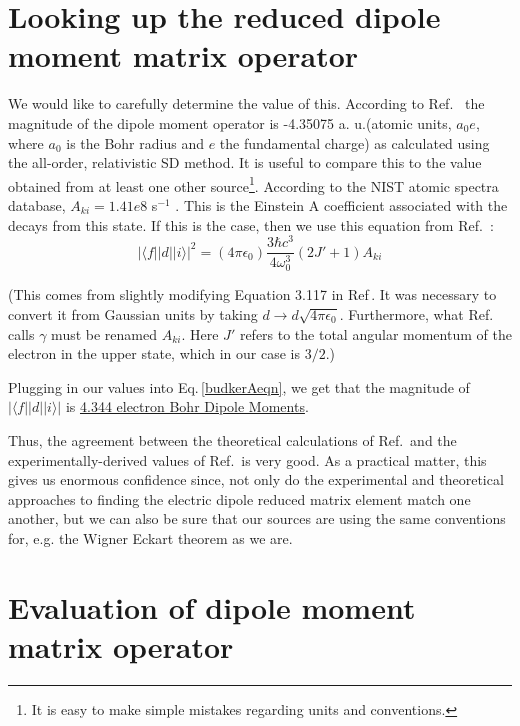 \section{Looking up the reduced dipole moment matrix operator} \label{lookItUp}
We would like to carefully determine the value of this. According to Ref.\ \cite{safronova2photon} the magnitude of the dipole moment operator is -4.35075 a. u.(atomic units, $a_0 e$, where $a_0$ is the Bohr radius and $e$ the fundamental charge) as calculated using the all-order, relativistic SD method. It is useful to compare this to the value obtained from at least one other source\footnote{It is easy to make simple mistakes regarding units and conventions.}. According to the NIST atomic spectra database, $A_{ki}=1.41e8$ s$^{-1}$ \cite{NISTasd}. This is the Einstein A coefficient associated with the decays from this state. If this is the case, then we use this equation from Ref.\ \cite{demilleBudkerKimball}:  
\begin{equation}
|\langle f ||d|| i \rangle|^2 = (4 \pi \epsilon_0) \frac{3 \hbar c^3}{4 \omega_0^3} (2 J'+1) A_{ki}\label{budkerAeqn}
\end{equation}

(This comes from slightly modifying Equation 3.117 in Ref\,\cite{demilleBudkerKimball}. It was necessary to convert it from Gaussian units by taking $d\rightarrow d \sqrt{4 \pi \epsilon_0}$. Furthermore, what Ref.\ \cite{demilleBudkerKimball} calls $\gamma$ must be renamed $A_{ki}$. Here $J'$ refers to the total angular momentum of the electron in the upper state, which in our case is $3/2$.) 

Plugging in our values into Eq.\,\ref{budkerAeqn}, we get that the magnitude of $|\langle f ||d|| i \rangle|$ is \href{http://www.wolframalpha.com/input/?i=sqrt%283*hbar*c%5E3%2F%284*%282*pi*c%2F407.771+nm%29%5E3%29*4*pi*epsilon_0*4*1.41e8*1%2Fs%29}{4.344 electron Bohr Dipole Moments}.

Thus, the agreement between the theoretical calculations of Ref.\,\cite{safronova2photon} and the experimentally-derived values of Ref.\,\cite{NISTasd} is very good. As a practical matter, this gives us enormous confidence since, not only do the experimental and theoretical approaches to finding the electric dipole reduced matrix element match one another, but we can also be sure that our sources are using the same conventions for, e.g. the Wigner Eckart theorem as we are.

\section{Evaluation of dipole moment matrix operator}

